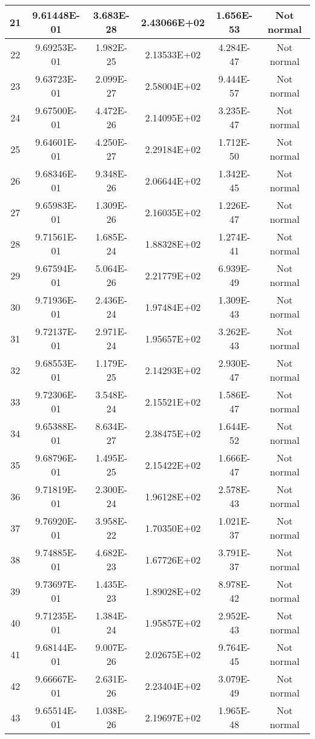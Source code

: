 \begin{table}[h]
\begin{tabular}{|c|c|c|c|c|c|}
		21 & 9.61448E-01 & 3.683E-28 & 2.43066E+02 & 1.656E-53 & Not normal\\\hline
		22 & 9.69253E-01 & 1.982E-25 & 2.13533E+02 & 4.284E-47 & Not normal\\\hline
		23 & 9.63723E-01 & 2.099E-27 & 2.58004E+02 & 9.444E-57 & Not normal\\\hline
		24 & 9.67500E-01 & 4.472E-26 & 2.14095E+02 & 3.235E-47 & Not normal\\\hline
		25 & 9.64601E-01 & 4.250E-27 & 2.29184E+02 & 1.712E-50 & Not normal\\\hline
		26 & 9.68346E-01 & 9.348E-26 & 2.06644E+02 & 1.342E-45 & Not normal\\\hline
		27 & 9.65983E-01 & 1.309E-26 & 2.16035E+02 & 1.226E-47 & Not normal\\\hline
		28 & 9.71561E-01 & 1.685E-24 & 1.88328E+02 & 1.274E-41 & Not normal\\\hline
		29 & 9.67594E-01 & 5.064E-26 & 2.21779E+02 & 6.939E-49 & Not normal\\\hline
		30 & 9.71936E-01 & 2.436E-24 & 1.97484E+02 & 1.309E-43 & Not normal\\\hline
		31 & 9.72137E-01 & 2.971E-24 & 1.95657E+02 & 3.262E-43 & Not normal\\\hline
		32 & 9.68553E-01 & 1.179E-25 & 2.14293E+02 & 2.930E-47 & Not normal\\\hline
		33 & 9.72306E-01 & 3.548E-24 & 2.15521E+02 & 1.586E-47 & Not normal\\\hline
		34 & 9.65388E-01 & 8.634E-27 & 2.38475E+02 & 1.644E-52 & Not normal\\\hline
		35 & 9.68796E-01 & 1.495E-25 & 2.15422E+02 & 1.666E-47 & Not normal\\\hline
		36 & 9.71819E-01 & 2.300E-24 & 1.96128E+02 & 2.578E-43 & Not normal\\\hline
		37 & 9.76920E-01 & 3.958E-22 & 1.70350E+02 & 1.021E-37 & Not normal\\\hline
		38 & 9.74885E-01 & 4.682E-23 & 1.67726E+02 & 3.791E-37 & Not normal\\\hline
		39 & 9.73697E-01 & 1.435E-23 & 1.89028E+02 & 8.978E-42 & Not normal\\\hline
		40 & 9.71235E-01 & 1.384E-24 & 1.95857E+02 & 2.952E-43 & Not normal\\\hline
		41 & 9.68144E-01 & 9.007E-26 & 2.02675E+02 & 9.764E-45 & Not normal\\\hline
		42 & 9.66667E-01 & 2.631E-26 & 2.23404E+02 & 3.079E-49 & Not normal\\\hline
		43 & 9.65514E-01 & 1.038E-26 & 2.19697E+02 & 1.965E-48 & Not normal\\\hline

\end{tabular}
\end{table}
